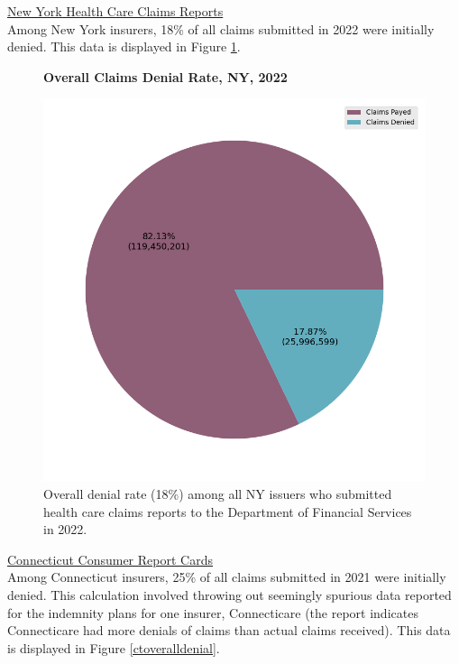 \documentclass[12pt, a4paper,twoside]{report}
\theoremstyle{plain} %
\theoremstyle{definition} %
\theoremstyle{remark} %
\numberwithin{equation}{chapter}
\begin{document}
		\underline{New York Health Care Claims Reports}\\
		
			Among New York insurers, 18\% of all claims submitted in 2022 were initially denied. This data is displayed in Figure \ref{newyorkoveralldenial}.
			
			\begin{figure}[h!]
				\centering
				\textbf{Overall Claims Denial Rate, NY, 2022}\par\medskip
				\includegraphics[width=.6\columnwidth]{images/ny_claim_reports/overall_denial_pie.png}
				\caption{Overall denial rate (18\%) among all NY issuers who submitted health care claims reports to the Department of Financial Services in 2022.}
				\label{newyorkoveralldenial}
			\end{figure}
		
		
		\underline{Connecticut Consumer Report Cards}\\
		
		Among Connecticut insurers, 25\% of all claims submitted in 2021 were initially denied. This calculation involved throwing out seemingly spurious data reported for the indemnity plans for one insurer, Connecticare (the report indicates Connecticare had more denials of claims than actual claims received). This data is displayed in Figure \ref{ctoveralldenial}.
		
\end{document}
